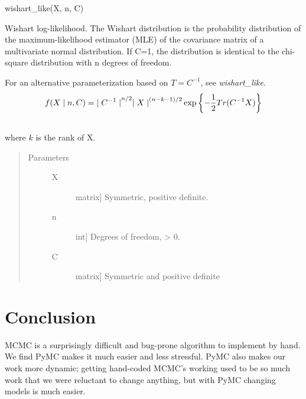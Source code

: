 \documentclass[letterpaper,10pt,english]{sphinxmanual}
\begin{document}
\begin{fulllineitems}
\label{distributions:pymc.distributions.wishart_cov_like}
wishart\_like(X, n, C)

Wishart log-likelihood. The Wishart distribution is the probability
distribution of the maximum-likelihood estimator (MLE) of the covariance
matrix of a multivariate normal distribution. If C=1, the distribution
is identical to the chi-square distribution with n degrees of freedom.

For an alternative parameterization based on $T=C^{-1}$, see
\emph{wishart\_like}.
\begin{gather}
\begin{split}f(X \mid n, C) = {\mid C^{-1} \mid}^{n/2}{\mid X \mid}^{(n-k-1)/2} \exp\left\{ -\frac{1}{2} Tr(C^{-1}X) \right\}\end{split}\notag\\\begin{split}\end{split}\notag
\end{gather}
where $k$ is the rank of X.
\begin{quote}\begin{description}
\item[{Parameters }] \leavevmode\begin{description}
\item[{X}] \leavevmode{[}matrix{]}
Symmetric, positive definite.

\item[{n}] \leavevmode{[}int{]}
Degrees of freedom, \textgreater{} 0.

\item[{C}] \leavevmode{[}matrix{]}
Symmetric and positive definite

\end{description}

\end{description}\end{quote}

\end{fulllineitems}



\chapter{Conclusion}
\label{conclusion::doc}\label{conclusion:conclusion}
MCMC is a surprisingly difficult and bug-prone algorithm to implement by hand. We find PyMC makes it much easier and less stressful. PyMC also makes our work more dynamic; getting hand-coded MCMC's working used to be so much work that we were reluctant to change anything, but with PyMC changing models is much easier.
\end{document}
